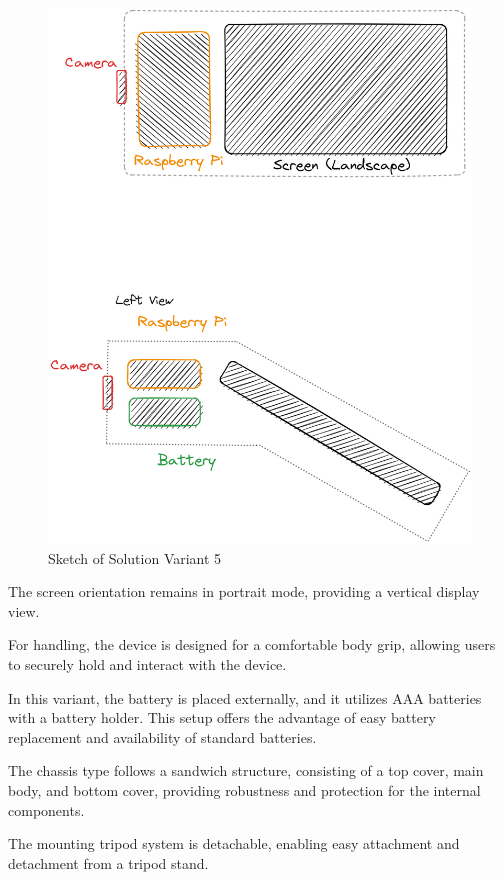 \begin{figure}[ht!]
    \centering
    \includegraphics[scale=0.25]{texs/Part1/chapter3/image/v5.png}
    \caption{Sketch of Solution Variant 5}
    \label{fig:sketch-solution-variant-5}
\end{figure}

The screen orientation remains in portrait mode, providing a vertical display view.

For handling, the device is designed for a comfortable body grip, allowing users to securely hold and interact with the device.

In this variant, the battery is placed externally, and it utilizes AAA batteries with a battery holder. This setup offers the advantage of easy battery replacement and availability of standard batteries.

The chassis type follows a sandwich structure, consisting of a top cover, main body, and bottom cover, providing robustness and protection for the internal components.

The mounting tripod system is detachable, enabling easy attachment and detachment from a tripod stand.

